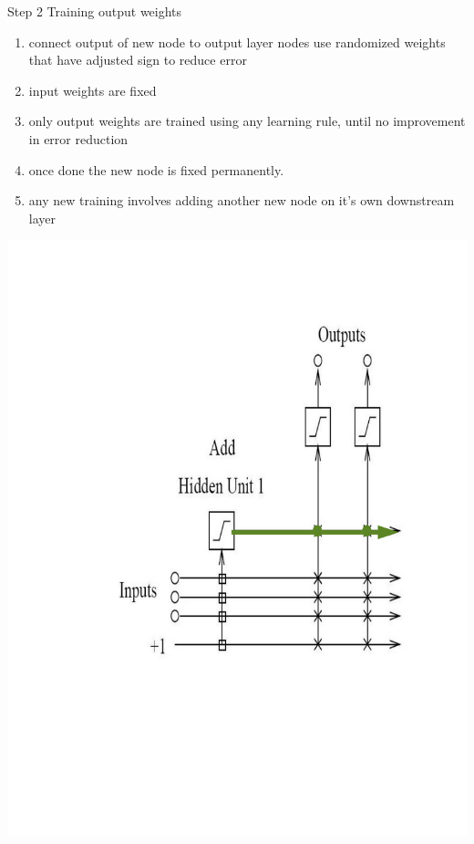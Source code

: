 \documentclass[presentation]{beamer}
\begin{document}
\begin{frame}[label={sec:org085d5cb}]{Step 2 Training output weights}
\begin{enumerate}
\item connect output of new node to output layer nodes
use randomized weights that have adjusted sign to reduce error
\item input weights are fixed
\item only output weights are trained using any learning rule, until no improvement in error reduction

\item once done the new node is fixed permanently.
\item any new training involves adding another new node on it's own downstream layer
\end{enumerate}
\begin{center}
\includegraphics[scale=0.20]{trainoutputunit.png}
\end{center}
\end{frame}
\end{document}
